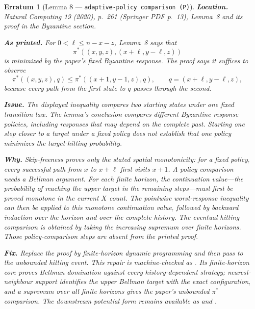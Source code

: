 \documentclass[11pt]{article}
\theoremstyle{erratumstyle}
\newtheorem{erratum}{Erratum}
\begin{document}
\begin{erratum}[Lemma 8 --- \texttt{adaptive-policy comparison (P)}]
\textbf{Location.} \emph{Natural Computing} 19 (2020), p.~261
(Springer PDF p.~13), Lemma~8 and its proof in the Byzantine section.

\medskip
\textbf{As printed.} For $0<\ell\le n-x-z$, Lemma~8 says that
\[
  \pi^*((x,y,z),(x+\ell,y-\ell,z))
\]
is minimized by the paper's fixed Byzantine response. The proof says it
suffices to observe
\[
 \pi^*((x,y,z),q)
 \le
 \pi^*((x+1,y-1,z),q),
 \qquad q=(x+\ell,y-\ell,z),
\]
because every path from the first state to $q$ passes through the second.

\medskip
\textbf{Issue.} The displayed inequality compares two starting states under
one fixed transition law. The lemma's conclusion compares different Byzantine
response policies, including responses that may depend on the complete past.
Starting one step closer to a target under a fixed policy does not establish
that one policy minimizes the target-hitting probability.

\medskip
\textbf{Why.} Skip-freeness proves only the stated spatial monotonicity: for a
fixed policy, every successful path from $x$ to $x+\ell$ first visits $x+1$.
A policy comparison needs a Bellman argument. For each finite horizon, the
continuation value---the probability of reaching the upper target in the
remaining steps---must first be proved monotone in the current $X$ count. The
pointwise worst-response inequality can then be applied to this monotone
continuation value, followed by backward induction over the horizon and over
the complete history. The eventual hitting comparison is obtained by taking
the increasing supremum over finite horizons. Those policy-comparison steps
are absent from the printed proof.

\medskip
\textbf{Fix.} Replace the proof by finite-horizon dynamic programming and then
pass to the unbounded hitting event. This repair is machine-checked as
. Its finite-horizon core
 proves Bellman domination against every
history-dependent strategy; nearest-neighbour support identifies the upper
Bellman target with the exact configuration, and a supremum over all finite
horizons gives the paper's unbounded $\pi^*$ comparison. The downstream
potential form remains available as
 and
.
\end{erratum}
\end{document}
